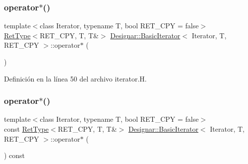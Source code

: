\mbox{\label{class_designar_1_1_basic_iterator_aed614b1aca7f9cb1552699b106bb281f}} 
\subsubsection{\texorpdfstring{operator$\ast$()}{operator*()}\hspace{0.1cm}{\footnotesize\ttfamily [1/2]}}
{\footnotesize\ttfamily template$<$class Iterator, typename T, bool R\+E\+T\+\_\+\+C\+PY = false$>$ \\
\hyperlink{namespace_designar_ab937f9c4bf5f1d0e65dbc616245d50ee}{Ret\+Type}$<$R\+E\+T\+\_\+\+C\+PY, T, T\&$>$ \hyperlink{class_designar_1_1_basic_iterator}{Designar\+::\+Basic\+Iterator}$<$ Iterator, T, R\+E\+T\+\_\+\+C\+PY $>$\+::operator$\ast$ (\begin{DoxyParamCaption}{ }\end{DoxyParamCaption})\hspace{0.3cm}{\ttfamily [inline]}}



Definición en la línea 50 del archivo iterator.\+H.

\mbox{\label{class_designar_1_1_basic_iterator_aa016cf79d8fd6b3e9f73c3dbbbaf7a31}} 
\subsubsection{\texorpdfstring{operator$\ast$()}{operator*()}\hspace{0.1cm}{\footnotesize\ttfamily [2/2]}}
{\footnotesize\ttfamily template$<$class Iterator, typename T, bool R\+E\+T\+\_\+\+C\+PY = false$>$ \\
const \hyperlink{namespace_designar_ab937f9c4bf5f1d0e65dbc616245d50ee}{Ret\+Type}$<$R\+E\+T\+\_\+\+C\+PY, T, T\&$>$ \hyperlink{class_designar_1_1_basic_iterator}{Designar\+::\+Basic\+Iterator}$<$ Iterator, T, R\+E\+T\+\_\+\+C\+PY $>$\+::operator$\ast$ (\begin{DoxyParamCaption}{ }\end{DoxyParamCaption}) const\hspace{0.3cm}{\ttfamily [inline]}}



